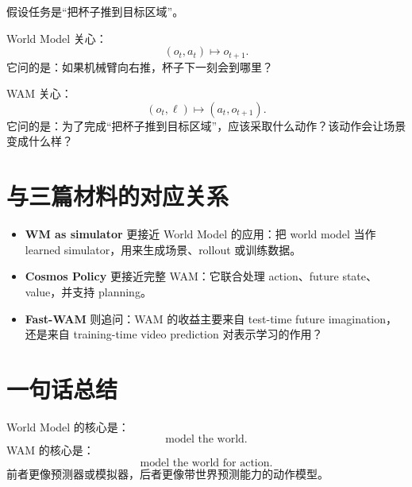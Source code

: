 \documentclass[11pt,a4paper]{ctexart}
\begin{document}
假设任务是“把杯子推到目标区域”。

World Model 关心：
\[
  (o_t,a_t)\mapsto o_{t+1}.
\]
它问的是：如果机械臂向右推，杯子下一刻会到哪里？

WAM 关心：
\[
  (o_t,\ell)\mapsto (a_t,o_{t+1}).
\]
它问的是：为了完成“把杯子推到目标区域”，应该采取什么动作？该动作会让场景变成什么样？

\section{与三篇材料的对应关系}

\begin{itemize}
  \item \textbf{WM as simulator} 更接近 World Model 的应用：把 world model 当作 learned simulator，用来生成场景、rollout 或训练数据。
  \item \textbf{Cosmos Policy} 更接近完整 WAM：它联合处理 action、future state、value，并支持 planning。
  \item \textbf{Fast-WAM} 则追问：WAM 的收益主要来自 test-time future imagination，还是来自 training-time video prediction 对表示学习的作用？
\end{itemize}

\section{一句话总结}

World Model 的核心是：
\[
  \text{model the world}.
\]
WAM 的核心是：
\[
  \text{model the world for action}.
\]
前者更像预测器或模拟器，后者更像带世界预测能力的动作模型。
\end{document}
